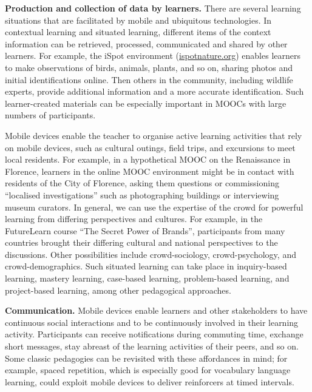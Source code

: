 \textbf{Production and collection of
data by learners.}  
There are several learning situations that are
facilitated by mobile and ubiquitous technologies. In contextual
learning and situated learning, different items of the context
information can be retrieved, processed, communicated and shared by
other learners. For example, the iSpot environment
(\url{ispotnature.org}) enables learners to make observations of
birds, animals, plants, and so on, sharing photos and initial
identifications online. Then others in the community, including
wildlife experts, provide additional information and a more accurate
identification. Such learner-created materials can be
especially important in MOOCs with large numbers of participants. 

Mobile devices enable the teacher to organise active
learning activities that rely on mobile devices, such as
cultural outings, field trips, and excursions to meet local residents.
For example, in a hypothetical MOOC on the
Renaissance in Florence, learners in the online MOOC environment might be
in contact with residents of the City of Florence, asking them questions
or commissioning ``localised investigations'' such as
photographing buildings or interviewing museum curators. In general, we
can use the expertise of the crowd for powerful learning from differing
perspectives and cultures. For example, in the FutureLearn course ``The
Secret Power 
of Brands'', participants from many countries
brought their differing cultural and national
perspectives to the discussions. Other possibilities include
crowd-sociology, crowd-psychology, and crowd-demographics. 
Such situated learning can take place in inquiry-based learning, mastery
learning, case-based learning, problem-based learning, and project-based
learning, among other pedagogical approaches.

\textbf{Communication.} Mobile devices enable learners and other
stakeholders to have continuous social interactions and to be
continuously involved in their learning activity.
Participants can receive notifications during commuting time, exchange
short messages, stay abreast of the learning activities of their peers,
and so on.
Some classic pedagogies can be revisited with these affordances in
mind; for example, spaced repetition, which is especially good for
vocabulary language learning, could exploit mobile devices to deliver
reinforcers at timed intervals.

